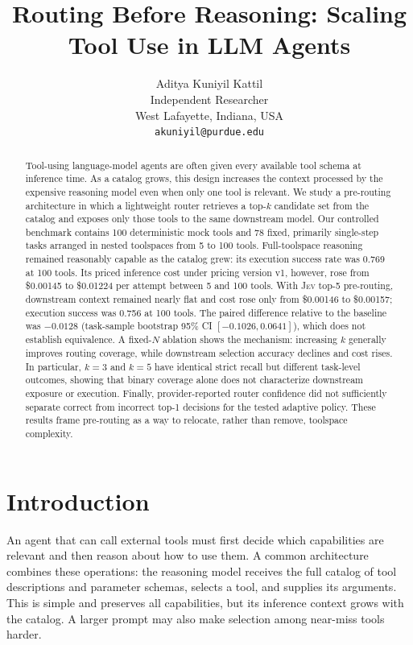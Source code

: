 \documentclass[10pt,twocolumn]{article}
\title{Routing Before Reasoning: Scaling Tool Use in LLM Agents}
\author{Aditya Kuniyil Kattil\\
Independent Researcher\\
West Lafayette, Indiana, USA\\
\texttt{akuniyil@purdue.edu}}
\date{}
\newcommand{\jev}{\textsc{Jev}}
\begin{document}
\maketitle

\begin{abstract}
Tool-using language-model agents are often given every available tool schema at inference time. As a catalog grows, this design increases the context processed by the expensive reasoning model even when only one tool is relevant. We study a pre-routing architecture in which a lightweight router retrieves a top-$k$ candidate set from the catalog and exposes only those tools to the same downstream model. Our controlled benchmark contains 100 deterministic mock tools and 78 fixed, primarily single-step tasks arranged in nested toolspaces from 5 to 100 tools. Full-toolspace reasoning remained reasonably capable as the catalog grew: its execution success rate was 0.769 at 100 tools. Its priced inference cost under pricing version v1, however, rose from \$0.00145 to \$0.01224 per attempt between 5 and 100 tools. With \jev{} top-5 pre-routing, downstream context remained nearly flat and cost rose only from \$0.00146 to \$0.00157; execution success was 0.756 at 100 tools. The paired difference relative to the baseline was $-0.0128$ (task-sample bootstrap 95\% CI $[-0.1026,0.0641]$), which does not establish equivalence. A fixed-$N$ ablation shows the mechanism: increasing $k$ generally improves routing coverage, while downstream selection accuracy declines and cost rises. In particular, $k=3$ and $k=5$ have identical strict recall but different task-level outcomes, showing that binary coverage alone does not characterize downstream exposure or execution. Finally, provider-reported router confidence did not sufficiently separate correct from incorrect top-1 decisions for the tested adaptive policy. These results frame pre-routing as a way to relocate, rather than remove, toolspace complexity.
\end{abstract}

\section{Introduction}

An agent that can call external tools must first decide which capabilities are relevant and then reason about how to use them. A common architecture combines these operations: the reasoning model receives the full catalog of tool descriptions and parameter schemas, selects a tool, and supplies its arguments. This is simple and preserves all capabilities, but its inference context grows with the catalog. A larger prompt may also make selection among near-miss tools harder.
\end{document}

